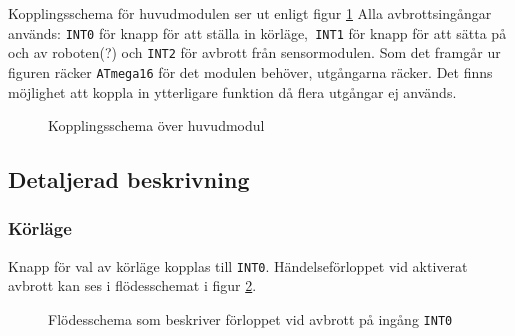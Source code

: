 \documentclass[11pt]{article}
\begin{document}
\begin{flushleft}
Kopplingsschema för huvudmodulen ser ut enligt figur \ref{kopplingsschema:huvudmodul} Alla avbrottsingångar används: \verb+INT0+ för knapp för att ställa in körläge,\verb+ INT1+ för knapp för att sätta på och av roboten(?) och \verb+INT2+ för avbrott från sensormodulen. Som det framgår ur figuren räcker \verb+ATmega16+ för det modulen behöver, utgångarna räcker. Det finns möjlighet att koppla in ytterligare funktion då flera utgångar ej används.  

\begin{figure}[htbp]
\centering
\noindent{}
	\caption{Kopplingsschema över huvudmodul \label{kopplingsschema:huvudmodul}}	
\end{figure}

\subsection{Detaljerad beskrivning}
\subsubsection {Körläge}
Knapp för val av körläge kopplas till \verb+INT0+. Händelseförloppet vid aktiverat avbrott kan ses i flödesschemat i figur \ref{avbrott_korlage}.

\begin{figure}[htbp]
\centering
\noindent\resizebox{.6\linewidth}{!}{
	}
	\cprotect\caption{Flödesschema som beskriver förloppet vid avbrott på ingång \verb+INT0+ \label{avbrott_korlage}}	
\end{figure}


\end{flushleft}
\end{document}
